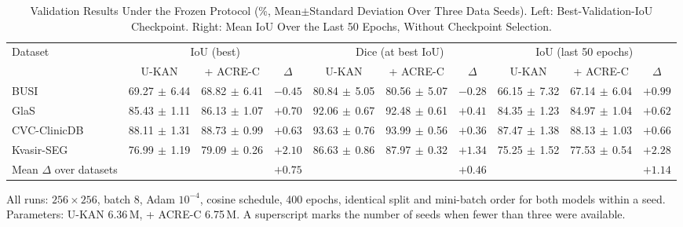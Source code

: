 \begin{table}[!t]
\caption{Validation Results Under the Frozen Protocol (\%, Mean$\pm$Standard Deviation Over Three Data Seeds). Left: Best-Validation-IoU Checkpoint. Right: Mean IoU Over the Last 50 Epochs, Without Checkpoint Selection.}
\label{tab:main}
\centering\footnotesize
\begin{threeparttable}
\setlength{\tabcolsep}{4.5pt}
\begin{tabular}{@{}lccc ccc ccc@{}}
\toprule
Dataset & \multicolumn{3}{c}{IoU (best)} & \multicolumn{3}{c}{Dice (at best IoU)} & \multicolumn{3}{c}{IoU (last 50 epochs)} \\
\cmidrule(lr){2-4}\cmidrule(lr){5-7}\cmidrule(lr){8-10}
 & U-KAN & + ACRE-C & $\Delta$ & U-KAN & + ACRE-C & $\Delta$ & U-KAN & + ACRE-C & $\Delta$ \\
\midrule
BUSI & 69.27$\,\pm\,$6.44 & 68.82$\,\pm\,$6.41 & $-0.45$ & 80.84$\,\pm\,$5.05 & 80.56$\,\pm\,$5.07 & $-0.28$ & 66.15$\,\pm\,$7.32 & 67.14$\,\pm\,$6.04 & $+0.99$ \\
GlaS & 85.43$\,\pm\,$1.11 & 86.13$\,\pm\,$1.07 & $+0.70$ & 92.06$\,\pm\,$0.67 & 92.48$\,\pm\,$0.61 & $+0.41$ & 84.35$\,\pm\,$1.23 & 84.97$\,\pm\,$1.04 & $+0.62$ \\
CVC-ClinicDB & 88.11$\,\pm\,$1.31 & 88.73$\,\pm\,$0.99 & $+0.63$ & 93.63$\,\pm\,$0.76 & 93.99$\,\pm\,$0.56 & $+0.36$ & 87.47$\,\pm\,$1.38 & 88.13$\,\pm\,$1.03 & $+0.66$ \\
Kvasir-SEG & 76.99$\,\pm\,$1.19 & 79.09$\,\pm\,$0.26 & $+2.10$ & 86.63$\,\pm\,$0.86 & 87.97$\,\pm\,$0.32 & $+1.34$ & 75.25$\,\pm\,$1.52 & 77.53$\,\pm\,$0.54 & $+2.28$ \\
\midrule
Mean $\Delta$ over datasets &  &  & $+0.75$ &  &  & $+0.46$ &  &  & $+1.14$ \\
\bottomrule
\end{tabular}
\begin{tablenotes}[flushleft]\footnotesize
\item All runs: $256\times256$, batch 8, Adam $10^{-4}$, cosine schedule, 400 epochs, identical split and mini-batch order for both models within a seed. Parameters: U-KAN 6.36\,M, + ACRE-C 6.75\,M. A superscript marks the number of seeds when fewer than three were available.
\end{tablenotes}
\end{threeparttable}
\end{table}
